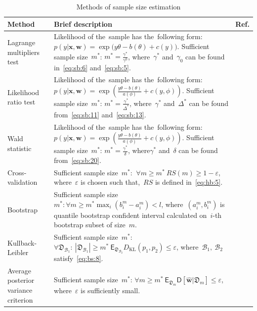 \documentclass[
11pt,%
tightenlines,%
twoside,%
onecolumn,%
nofloats,%
nobibnotes,%
nofootinbib,%
superscriptaddress,%
noshowpacs,%
centertags]%
{revtex4}
\begin{document}
\begin{table}
\caption{Methods of sample size estimation}
\label{table1}
\begin{tabular}{p{}|p{}|p{}}
\hline
	\centering Method &\centering Brief description & Ref.\\%
\hline
	Lagrange multipliers test &
	Likelihood of the~sample has the~following form: $p(y|\mathbf{x}, \mathbf{w}) = \exp\bigl(y\theta- b(\theta) + c(y)\bigr).$
	Sufficient sample size~$m^*$: $m^* = \frac{\gamma^*}{\gamma^0}$, where~$\gamma^*$ and~$\gamma_0$ can be found in~\eqref{eq:sb:6} and~\eqref{eq:sb:5}.
	&\cite{self1988}\\
\hline
	Likelihood ratio test &
	Likelihood of the~sample has the~following form: $p(y|\mathbf{x}, \mathbf{w}) = \exp\left(\frac{y\theta- b(\theta)}{a(\phi)} + c\left(y, \phi\right)\right).$ Sufficient sample size~$m^*$:  $m^* = \frac{\gamma^*}{\Delta^*}$, where~$\gamma^*$ and~$\Delta^*$ can be found from~\eqref{eq:sb:11} and~\eqref{eq:sb:13}.
	&\cite{shieh2000}\\
\hline
	Wald statistic &
	Likelihood of the~sample has the~following form: $p(y|\mathbf{x}, \mathbf{w}) = \exp\left(\frac{y\theta- b(\theta)}{a(\phi)} + c\left(y, \phi\right)\right).$ Sufficient sample size~$m^*$: $m^* = \frac{\gamma^*}{\delta}$, where$\gamma^*$ and~$\delta$ can be found from~\eqref{eq:sb:20}.
	&\cite{shieh2005}\\
\hline
	Cross-validation &
	Sufficient sample size~$m^*$: $~\forall m \geq m^*~RS(m) \geq 1- \varepsilon$, where~$\varepsilon$ is chosen such that,~$RS$ is defined in~\eqref{eq:hb:5}.
	&\cite{motrenko2014}\\
\hline
	Bootstrap &
	Sufficient sample size~$m^*: \forall m\geq m^* \max_i\left(b^m_i - a^m_i\right) < l$, where~$(a^m_i, b^m_i)$ is quantile bootstrap confident interval calculated on~$i$-th bootstrap subset of size~$m$.
	&\cite{qumsiyeh2013}\\
\hline
	Kullback-Leibler &	
	Sufficient sample size~$m^*$: $\forall \mathfrak{D}_{\mathcal{B}_1}:~\left|\mathfrak{D}_{\mathcal{B}_1}\right| \geq m^* ~ \mathsf{E}_{\mathfrak{D}_{\mathcal{B}_2}}D_\text{KL}\left(p_1, p_2\right) \leq \varepsilon$,
	where~$\mathcal{B}_1,~\mathcal{B}_2$ satisfy~\eqref{eq:bs:8}.
	&\cite{motrenko2014}\\
\hline
	Average posterior variance criterion &
	Sufficient sample size~$m^*$:  $\forall m \geq m^* ~ \mathsf{E}_{\mathfrak{D}_m}\mathsf{D}\left[\hat{\mathbf{w}}|\mathfrak{D}_m\right] \leq \varepsilon$, where~$\varepsilon$ is sufficiently small.

\end{tabular}
\end{table}
\end{document}
